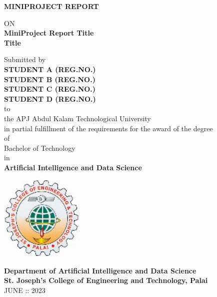 \thispagestyle{empty}
\begin{center}
 
  {\Large \bf MINIPROJECT REPORT}

ON\\
  {\large \bf MiniProject Report Title\\ Title}

   \vspace*{1 cm}
   {\large Submitted by\\ { \bf STUDENT A (REG.NO.)}\\
   { \bf STUDENT B (REG.NO.)}\\
    { \bf STUDENT C (REG.NO.)}\\
   { \bf STUDENT D (REG.NO.)}}\\[-0.6mm]
  {\large to\\[-0.6mm] the APJ Abdul Kalam Technological University\\[-0.6mm] in partial fulfillment of the requirements for the award of the degree\\[-0.6mm] of\\[-0.6mm] Bachelor of Technology\\[-0.6mm] in\\[-0.6mm] {\bf Artificial Intelligence and Data Science}}
  
   \begin{center}
   \includegraphics[width=0.3\textwidth]{Images/SJCET_logo.jpg}
   \end{center}
   \vspace*{-0.5cm}
  {\LARGE {\bf Department of Artificial Intelligence and Data Science}}\\
          [-3mm] {\large {\bf St. Joseph's College of Engineering and Technology, Palai}\\
           [1mm] JUNE :: 2023}

\end{center}
